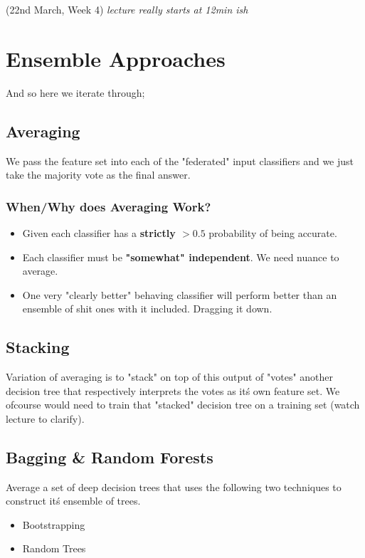 \documentclass{article}
\begin{document}
(22nd March, Week 4)
{\em lecture really starts at 12min ish}

\section*{Ensemble Approaches}
And so here we iterate through;

\subsection*{Averaging}
We pass the feature set into each of the "federated" input classifiers and we just take the majority vote as the final answer.

\subsubsection*{When/Why does Averaging Work?}
\begin{itemize}
	\item Given each classifier has a {\bf strictly $> 0.5$} probability of being accurate.
	\item Each classifier must be {\bf "somewhat" independent}. We need nuance to average.
	\item One very "clearly better" behaving classifier will perform better than an ensemble of shit ones with it included. Dragging it down.
\end{itemize}

\subsection*{Stacking}
Variation of averaging is to "stack" on top of this output of "votes" another decision tree that respectively interprets the votes as it\'s own feature set. We ofcourse would need to train that "stacked" decision tree on a training set (watch lecture to clarify).

\subsection*{Bagging \& Random Forests}
Average a set of deep decision trees that uses the following two techniques to construct it\'s ensemble of trees.

\begin{itemize}
	\item Bootstrapping
	\item Random Trees
\end{itemize}
\end{document}
